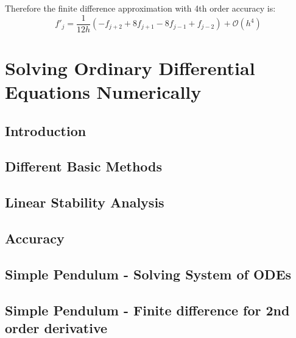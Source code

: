 \documentclass[
]{book}
\begin{document}
Therefore the finite difference approximation with 4th order accuracy is:
\begin{equation}
f'_j = \frac{1}{12h}(-f_{j+2}+8f_{j+1}-8f_{j-1}+f_{j-2}) + \mathcal{O}(h^4)
\end{equation}

\hypertarget{solving-ordinary-differential-equations-numerically}{%
\chapter{Solving Ordinary Differential Equations Numerically}\label{solving-ordinary-differential-equations-numerically}}

\hypertarget{introduction-2}{%
\section{Introduction}\label{introduction-2}}

\hypertarget{different-basic-methods}{%
\section{Different Basic Methods}\label{different-basic-methods}}

\hypertarget{linear-stability-analysis}{%
\section{Linear Stability Analysis}\label{linear-stability-analysis}}

\hypertarget{accuracy-1}{%
\section{Accuracy}\label{accuracy-1}}

\hypertarget{simple-pendulum---solving-system-of-odes}{%
\section{Simple Pendulum - Solving System of ODEs}\label{simple-pendulum---solving-system-of-odes}}

\hypertarget{simple-pendulum---finite-difference-for-2nd-order-derivative}{%
\section{Simple Pendulum - Finite difference for 2nd order derivative}\label{simple-pendulum---finite-difference-for-2nd-order-derivative}}

  
\end{document}
